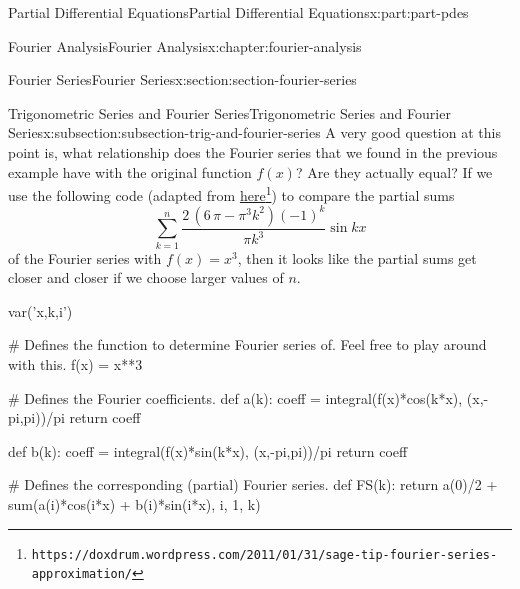 \documentclass[twoside,10pt,]{book}
\numberwithin{equation}{part}
\begin{document}
\begin{partptx}{Partial Differential Equations}{}{Partial Differential Equations}{}{}{x:part:part-pdes}
\begin{chapterptx}{Fourier Analysis}{}{Fourier Analysis}{}{}{x:chapter:fourier-analysis}
\begin{sectionptx}{Fourier Series}{}{Fourier Series}{}{}{x:section:section-fourier-series}
\begin{subsectionptx}{Trigonometric Series and Fourier Series}{}{Trigonometric Series and Fourier Series}{}{}{x:subsection:subsection-trig-and-fourier-series}
A very good question at this point is, what relationship does the Fourier series that we found in the previous example have with the original function \(f(x)\)? Are they actually equal? If we use the following code (adapted from \href{https://doxdrum.wordpress.com/2011/01/31/sage-tip-fourier-series-approximation/}{here}\footnote{\nolinkurl{https://doxdrum.wordpress.com/2011/01/31/sage-tip-fourier-series-approximation/}\label{g:fn:idp105548816674848}}) to compare the partial sums%
\begin{equation*}
\sum_{k=1}^{n}\frac{2 \, {\left(6 \, \pi - \pi^{3} k^{2}\right)} \left(-1\right)^{k}}{\pi k^{3}}\sin kx
\end{equation*}
of the Fourier series with \(f(x) = x^{3}\), then it looks like the partial sums get closer and closer if we choose larger values of \(n\).%
\begin{sageinput}
var('x,k,i')

# Defines the function to determine Fourier series of. Feel free to play around with this.
f(x) = x**3

# Defines the Fourier coefficients.
def a(k):
  coeff = integral(f(x)*cos(k*x), (x,-pi,pi))/pi
  return coeff

def b(k):
  coeff = integral(f(x)*sin(k*x), (x,-pi,pi))/pi
  return coeff

# Defines the corresponding (partial) Fourier series.
def FS(k):
  return a(0)/2 + sum(a(i)*cos(i*x) + b(i)*sin(i*x), i, 1, k)


\end{sageinput}
\end{subsectionptx}
\end{sectionptx}
\end{chapterptx}
\end{partptx}
\end{document}
